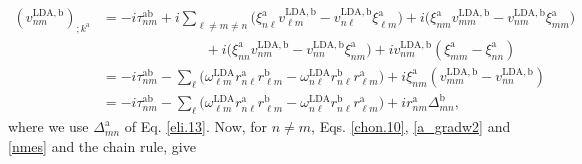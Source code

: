 \begin{align}\label{nmes}
(v^{\mathrm{LDA},\mathrm{b}}_{nm})_{;k^{\mathrm{a}}}&=
-i\tau^{\mathrm{a}\mathrm{b}}_{nm}
+i  
\sum_{\ell\ne m\ne n}
\bigg(
\xi^{\mathrm{a}}_{n\ell}  
v^{\mathrm{LDA},\mathrm{b}}_{\ell m}
-  
v^{\mathrm{LDA},\mathrm{b}}_{n\ell}
\xi^{\mathrm{a}}_{\ell m}
\bigg)  
+i  
\bigg(
\xi^{\mathrm{a}}_{nm}  
v^{\mathrm{LDA},\mathrm{b}}_{mm}
-  
v^{\mathrm{LDA},\mathrm{b}}_{nm}
\xi^{\mathrm{a}}_{mm}
\bigg)  
\nonumber\\
&\qquad\qquad\qquad\quad\,\,+  
i  
\bigg(
\xi^{\mathrm{a}}_{nn}  
v^{\mathrm{LDA},\mathrm{b}}_{nm}
-  
v^{\mathrm{LDA},\mathrm{b}}_{nn}
\xi^{\mathrm{a}}_{nm}
\bigg)  
+i   
v^{\mathrm{LDA},\mathrm{b}}_{nm}(\xi^{\mathrm{a}}_{mm}
-
\xi^{\mathrm{a}}_{nn}
)  
\nonumber \\
&=
-i\tau^{\mathrm{a}\mathrm{b}}_{nm}
-
\sum_{\ell}
\bigg(
\omega^\mathrm{LDA}_{\ell m}  
r^{\mathrm{a}}_{n\ell}  
r^{\mathrm{b}}_{\ell m}
-
\omega^\mathrm{LDA}_{n\ell}  
r^{\mathrm{b}}_{n\ell}  
r^{\mathrm{a}}_{\ell m}
\bigg)  
+i  
\xi^{\mathrm{a}}_{nm}
(v^{\mathrm{LDA},\mathrm{b}}_{mm}
-  
v^{\mathrm{LDA},\mathrm{b}}_{nn}
)  
\nonumber \\
&=
-i\tau^{\mathrm{a}\mathrm{b}}_{nm}
-
\sum_{\ell}
\bigg(
\omega^\mathrm{LDA}_{\ell m}   
r^{\mathrm{a}}_{n\ell}   
r^{\mathrm{b}}_{\ell m}
-
\omega^\mathrm{LDA}_{n\ell}   
r^{\mathrm{b}}_{n\ell}   
r^{\mathrm{a}}_{\ell m}
\bigg)  
+i   
r^{\mathrm{a}}_{nm}
\Delta^{\mathrm{b}}_{mn}
,
\end{align}   
where we use $\Delta^\mathrm{a}_{mn}$ of Eq. \eqref{eli.13}.
Now, for $n \ne m$, Eqs. \eqref{chon.10},
 \eqref{a_gradw2} and 
 \eqref{nmes} and the chain rule, give
